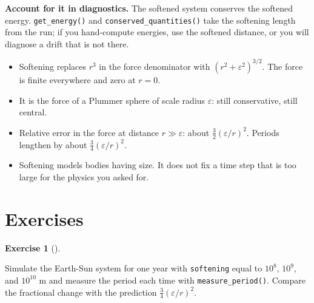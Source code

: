 \documentclass[
  10.5pt,
  letterpaper,
]{scrbook}
\providecommand{\tightlist}{%
  \setlength{\itemsep}{0pt}\setlength{\parskip}{0pt}}
\theoremstyle{definition}
\newtheorem{exercise}{Exercise}[chapter]
\theoremstyle{plain}
\theoremstyle{remark}
\begin{document}
\textbf{Account for it in diagnostics.} The softened system conserves
the softened energy. \texttt{get\_energy()} and
\texttt{conserved\_quantities()} take the softening length from the run;
if you hand-compute energies, use the softened distance, or you will
diagnose a drift that is not there.

\begin{tcolorbox}[enhanced jigsaw, arc=.35mm, bottomrule=.15mm, bottomtitle=1mm, breakable, colback=white, colbacktitle=quarto-callout-tip-color!10!white, colframe=quarto-callout-tip-color-frame, coltitle=black, left=2mm, leftrule=.75mm, opacityback=0, opacitybacktitle=0.6, rightrule=.15mm, title={Key results}, titlerule=0mm, toprule=.15mm, toptitle=1mm]

\begin{itemize}
\tightlist
\item
  Softening replaces \(r^3\) in the force denominator with
  \((r^2+\varepsilon^2)^{3/2}\). The force is finite everywhere and zero
  at \(r = 0\).
\item
  It is the force of a Plummer sphere of scale radius \(\varepsilon\):
  still conservative, still central.
\item
  Relative error in the force at distance \(r \gg \varepsilon\): about
  \(\tfrac32(\varepsilon/r)^2\). Periods lengthen by about
  \(\tfrac34(\varepsilon/r)^2\).
\item
  Softening models bodies having size. It does not fix a time step that
  is too large for the physics you asked for.
\end{itemize}

\end{tcolorbox}

\section*{Exercises}\label{exercises-5}


\begin{exercise}[]\protect\hypertarget{exr-ch6-period}{}\label{exr-ch6-period}

Simulate the Earth-Sun system for one year with \texttt{softening} equal
to \(10^8\), \(10^9\), and \(10^{10}\) m and measure the period each
time with \texttt{measure\_period()}. Compare the fractional change with
the prediction \(\tfrac34(\varepsilon/r)^2\).

\end{exercise}
\end{document}
